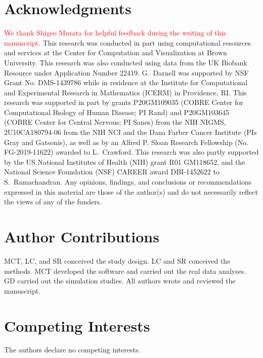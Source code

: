 \documentclass[10pt,a4paper]{article}
\begin{document}
\section*{Acknowledgments}\label{InterPath-Acknowledgments}

\textcolor{red}{We thank Shigeo Murata for helpful feedback during the writing of this manuscript.} This research was conducted in part using computational resources and services at the Center for Computation and Visualization at Brown University. This research was also conducted using data from the UK Biobank Resource under Application Number 22419. G.~Darnell was supported by NSF Grant No. DMS-1439786 while in residence at the Institute for Computational and Experimental Research in Mathematics (ICERM) in Providence, RI. This research was supported in part by grants P20GM109035 (COBRE Center for Computational Biology of Human Disease; PI Rand) and P20GM103645 (COBRE Center for Central Nervous; PI Sanes) from the NIH NIGMS, 2U10CA180794-06 from the NIH NCI and the Dana Farber Cancer Institute (PIs Gray and Gatsonis), as well as by an Alfred P. Sloan Research Fellowship (No. FG-2019-11622) awarded to L.~Crawford. This research was also partly supported by the US National Institutes of Health (NIH) grant R01 GM118652, and the National Science Foundation (NSF) CAREER award DBI-1452622 to S.~Ramachandran. Any opinions, findings, and conclusions or recommendations expressed in this material are those of the author(s) and do not necessarily reflect the views of any of the funders.

\section*{Author Contributions}\label{InterPath-Author-Contributions}

MCT, LC, and SR conceived the study design. LC and SR conceived the methods. MCT developed the software and carried out the real data analyses. GD carried out the simulation studies. All authors wrote and reviewed the manuscript.

\section*{Competing Interests}\label{InterPath-Competing-Interests}

The authors declare no competing interests.

\nolinenumbers

\begingroup
%

\endgroup
\end{document}
